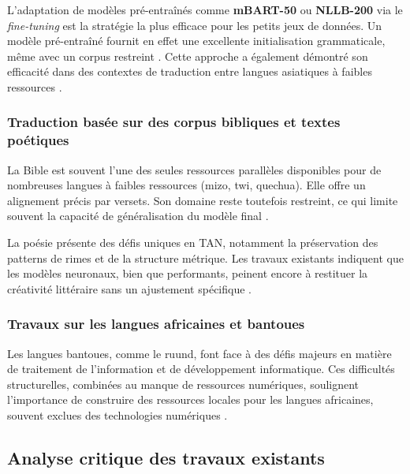 L'adaptation de modèles pré-entraînés comme \textbf{mBART-50} ou \textbf{NLLB-200} via le \textit{fine-tuning} est la stratégie la plus efficace pour les petits jeux de données. Un modèle pré-entraîné fournit en effet une excellente initialisation grammaticale, même avec un corpus restreint \cite{kozhirbayev2024enhancing, hong2024cantonmt}. Cette approche a également démontré son efficacité dans des contextes de traduction entre langues asiatiques à faibles ressources \cite{tran2024improving}.

\subsubsection{Traduction basée sur des corpus bibliques et textes poétiques}

La Bible est souvent l'une des seules ressources parallèles disponibles pour de nombreuses langues à faibles ressources (mizo, twi, quechua). Elle offre un alignement précis par versets. Son domaine reste toutefois restreint, ce qui limite souvent la capacité de généralisation du modèle final \cite{chanambam2022, angel2023comparing}.

La poésie présente des défis uniques en \ac{TAN}, notamment la préservation des patterns de rimes et de la structure métrique. Les travaux existants indiquent que les modèles neuronaux, bien que performants, peinent encore à restituer la créativité littéraire sans un ajustement spécifique \cite{dundjer2020automatic, liebeskind2024machine}.

\subsubsection{Travaux sur les langues africaines et bantoues}

Les langues bantoues, comme le ruund, font face à des défis majeurs en matière de traitement de l'information et de développement informatique. Ces difficultés structurelles, combinées au manque de ressources numériques, soulignent l'importance de construire des ressources locales pour les langues africaines, souvent exclues des technologies numériques \cite{ranathunga2023neural}.

\subsection{Analyse critique des travaux existants}


